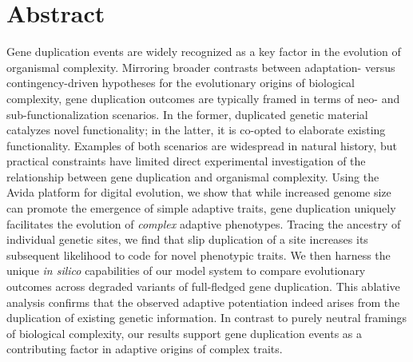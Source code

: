 \section*{Abstract}

Gene duplication events are widely recognized as a key factor in the evolution of organismal complexity.
Mirroring broader contrasts between adaptation- versus contingency-driven hypotheses for the evolutionary origins of biological complexity, gene duplication outcomes are typically framed in terms of neo- and sub-functionalization scenarios.
In the former, duplicated genetic material catalyzes novel functionality; in the latter, it is co-opted to elaborate existing functionality.
Examples of both scenarios are widespread in natural history, but practical constraints have limited direct experimental investigation of the relationship between gene duplication and organismal complexity.
Using the Avida platform for digital evolution, we show that while increased genome size can promote the emergence of simple adaptive traits, gene duplication uniquely facilitates the evolution of \textit{complex} adaptive phenotypes.
Tracing the ancestry of individual genetic sites, we find that slip duplication of a site increases its subsequent likelihood to code for novel phenotypic traits.
We then harness the unique \textit{in silico} capabilities of our model system to compare evolutionary outcomes across degraded variants of full-fledged gene duplication.
This ablative analysis confirms that the observed adaptive potentiation indeed arises from the duplication of existing genetic information.
In contrast to purely neutral framings of biological complexity, our results support gene duplication events as a contributing factor in adaptive origins of complex traits.
